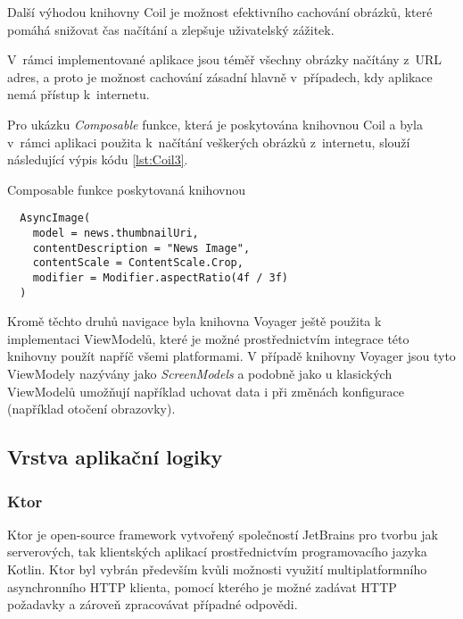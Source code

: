Další výhodou knihovny Coil je možnost efektivního cachování obrázků, které pomáhá snižovat čas načítání a zlepšuje uživatelský zážitek.

\medskip

V~rámci implementované aplikace jsou téměř všechny obrázky načítány z~URL adres, a proto je možnost cachování zásadní hlavně v~případech, 
kdy aplikace nemá přístup k~internetu.

Pro ukázku \textit{Composable} funkce, která je poskytována knihovnou Coil a byla v~rámci
aplikaci použita k~načítání veškerých obrázků z~internetu, slouží následující výpis kódu \ref{lst:Coil3}.

\begin{listing}[H]
\caption{Composable funkce poskytovaná knihovnou}\label{lst:Coil3}
\begin{verbatim}
  AsyncImage(
    model = news.thumbnailUri,
    contentDescription = "News Image",
    contentScale = ContentScale.Crop,
    modifier = Modifier.aspectRatio(4f / 3f)
  )
\end{verbatim}
\end{listing}

Kromě těchto druhů navigace byla knihovna Voyager ještě použita k implementaci ViewModelů, které je možné prostřednictvím integrace této knihovny
použít napříč všemi platformami. V případě knihovny Voyager jsou tyto ViewModely nazývány jako \textit{ScreenModels} a podobně jako u klasických
ViewModelů umožňují například uchovat data i při změnách konfigurace (například otočení obrazovky). \cite{voyagerScreeNmodel}

\subsection{Vrstva aplikační logiky}

\subsubsection*{Ktor}
Ktor je open-source framework vytvořený společností JetBrains pro tvorbu jak serverových, tak klientských aplikací prostřednictvím programovacího 
jazyka Kotlin. Ktor byl vybrán především kvůli možnosti využití multiplatformního asynchronního HTTP klienta, pomocí kterého je možné zadávat 
HTTP požadavky a zároveň zpracovávat případné odpovědi. 

